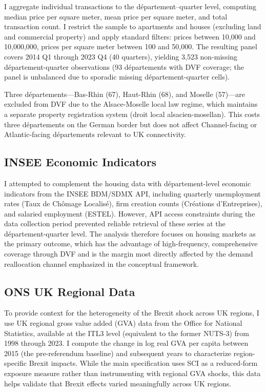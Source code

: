 \documentclass[12pt]{article}
\newcommand{\EUR}[1]{\texteuro{}#1}
\begin{document}
I aggregate individual transactions to the d\'epartement--quarter level, computing median price per square meter, mean price per square meter, and total transaction count. I restrict the sample to apartments and houses (excluding land and commercial property) and apply standard filters: prices between \EUR{10,000} and \EUR{10,000,000}, prices per square meter between \EUR{100} and \EUR{50,000}. The resulting panel covers 2014 Q1 through 2023 Q4 (40 quarters), yielding 3,523 non-missing d\'epartement-quarter observations (93 d\'epartements with DVF coverage; the panel is unbalanced due to sporadic missing d\'epartement-quarter cells).

Three d\'epartements---Bas-Rhin (67), Haut-Rhin (68), and Moselle (57)---are excluded from DVF due to the Alsace-Moselle local law regime, which maintains a separate property registration system (droit local alsacien-mosellan). This costs three d\'epartements on the German border but does not affect Channel-facing or Atlantic-facing d\'epartements relevant to UK connectivity.

\subsection{INSEE Economic Indicators}

I attempted to complement the housing data with d\'epartement-level economic indicators from the INSEE BDM/SDMX API, including quarterly unemployment rates (Taux de Ch\^omage Localis\'e), firm creation counts (Cr\'eations d'Entreprises), and salaried employment (ESTEL). However, API access constraints during the data collection period prevented reliable retrieval of these series at the d\'epartement-quarter level. The analysis therefore focuses on housing markets as the primary outcome, which has the advantage of high-frequency, comprehensive coverage through DVF and is the margin most directly affected by the demand reallocation channel emphasized in the conceptual framework.

\subsection{ONS UK Regional Data}

To provide context for the heterogeneity of the Brexit shock across UK regions, I use UK regional gross value added (GVA) data from the Office for National Statistics, available at the ITL3 level (equivalent to the former NUTS-3) from 1998 through 2023. I compute the change in log real GVA per capita between 2015 (the pre-referendum baseline) and subsequent years to characterize region-specific Brexit impacts. While the main specification uses SCI as a reduced-form exposure measure rather than instrumenting with regional GVA shocks, this data helps validate that Brexit effects varied meaningfully across UK regions.
\end{document}
